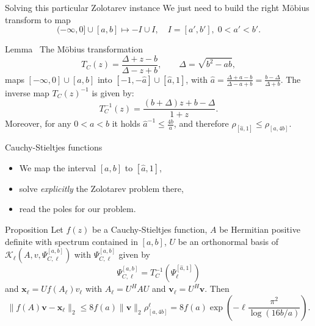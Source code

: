 \documentclass[aspectratio=169,xcolor=dvipsnames]{beamer}
\newcommand{\Pole}{\Psi}
\begin{document}
	\begin{frame}{\faHammer\;Solving this particular Zolotarev instance}
	We just need to build the right M\"obius transform to map
	\[
	(-\infty,0] \cup [a,b]  \mapsto -I \cup I, \quad I = [a',b'], \; 0 < a' < b'.
	\]	
	
	\begin{alertblock}{Lemma~\parencite[Lemma~4]{MR4235307}}
	The M\"obius transformation \[
	T_C(z)=\frac{\Delta + z - b}{\Delta - z + b},  \qquad 
	\Delta = \sqrt{b^2 - ab},
	\]
	maps $[-\infty,0]\cup[a,b]$ into $[-1, -\widehat a]\cup[\widehat a, 1]$, with $\widehat a = \frac{\Delta + a - b}{\Delta - a + b}=\frac{b-\Delta }{\Delta +b}$. The inverse map
	$T_C(z)^{-1}$ is given by:
	\[
	T_C^{-1}(z)= \frac{(b+\Delta)z+b-\Delta}{1+z}.
	\]
	Moreover, for any $0<a<b$ it holds $\widehat a^{-1} \leq \frac{4b}{a}$, 
	and therefore 
	$\rho_{[\widehat a,1]}\leq \rho_{[a,4b]}$.
	\end{alertblock}
	
	\end{frame}

	\begin{frame}{Cauchy-Stieltjes functions}
		
	\begin{itemize}
		\item[\faCog] We map the interval $[a,b]$ to $[\hat{a},1]$,
		\item[\faWrench] solve \emph{explicitly} the Zolotarev problem there,
		\item[\faBookReader] read the poles for our problem.
	\end{itemize}
	
	\begin{alertblock}{Proposition \parencite[Corollary 4]{MR4235307}}
	Let $f(z)$ be a Cauchy-Stieltjes function, $A$ be Hermitian positive definite with spectrum contained in $[a,b]$, $U$ be an orthonormal basis of $\mathcal{K}_\ell(A,v,\Pole_{C,\ell}^{[a,b]})$
	with $\Pole_{C,\ell}^{[a,b]}$ given by
	\[
	\Pole_{C,\ell}^{[a,b]} = T_C^{-1}(\Pole_\ell^{[\widehat a,1]})
	\]
	and $\mathbf{x}_\ell=Uf(A_\ell)v_\ell$ with $A_\ell=U^HAU$ and $\mathbf{v}_\ell=U^H\mathbf{v}$. Then
	\begin{equation*}
		\|f(A)\mathbf{v}-\mathbf{x}_\ell\|_2\leq 8f(a)  \|\mathbf{v}\|_2 \rho_{[a,4b]}^\ell = 8 f(a) \exp\left(-\ell \frac{\pi^2}{\log\left(16b/a \right)}\right) .
	\end{equation*}
	\end{alertblock}
	
	\end{frame}
\end{document}
